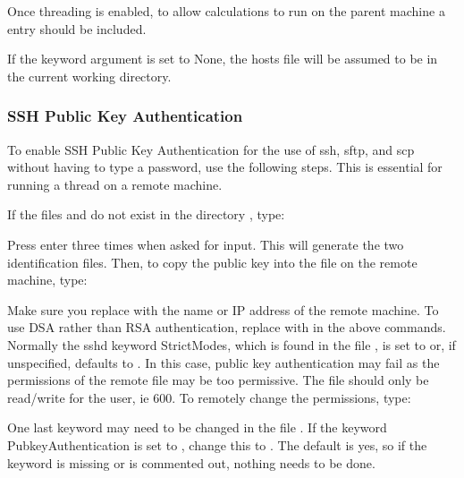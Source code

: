  Once threading is enabled, to allow calculations to run on the parent machine a  entry should be included. 
  

 If the keyword argument  is set to None, the hosts file will be assumed to be in the current working directory. 
  

  
 \subsubsection{SSH Public Key Authentication} 

 To enable SSH Public Key Authentication for the use of ssh, sftp, and scp without having to type a password, use the following steps.  This is essential for running a thread on a remote machine. 
  

 If the files  and  do not exist in the directory , type: 
  


 Press enter three times when asked for input.  This will generate the two identification files.  Then, to copy the public key into the  file on the remote machine, type: 
  


 Make sure you replace  with the name or IP address of the remote machine.  To use DSA rather than RSA authentication, replace  with  in the above commands. Normally the sshd keyword StrictModes, which is found in the file , is set to  or, if unspecified, defaults to .  In this case, public key authentication may fail as the permissions of the remote file  may be too permissive.  The file should only be read/write for the user, ie 600.  To remotely change the permissions, type: 
  


 One last keyword may need to be changed in the file .  If the keyword PubkeyAuthentication is set to , change this to .  The default is yes, so if the keyword is missing or is commented out, nothing needs to be done. 
  

